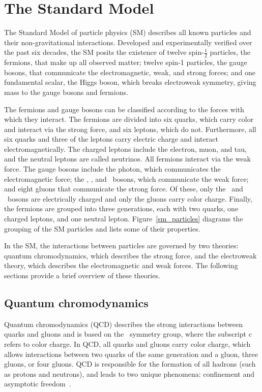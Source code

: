 \section{The Standard Model}
The Standard Model of particle physics (SM) describes all known particles and their non-gravitational interactions. Developed and experimentally verified over the past six decades, the SM posits the existence of twelve spin-$\frac{1}{2}$ particles, the fermions, that make up all observed matter; twelve spin-1 particles, the gauge bosons, that communicate the electromagnetic, weak, and strong forces; and one fundamental scalar, the Higgs boson, which breaks electroweak symmetry, giving mass to the gauge bosons and fermions.

The fermions and gauge bosons can be classified according to the forces with which they interact. The fermions are divided into six quarks, which carry color and interact via the strong force, and six leptons, which do not. Furthermore, all six quarks and three of the leptons carry electric charge and interact electromagnetically. The charged leptons include the electron, muon, and tau, and the neutral leptons are called neutrinos. All fermions interact via the weak force. The gauge bosons include the photon, which communicates the electromagnetic force; the \PWp, \PWm, and \cPZ\ bosons, which communicate the weak force; and eight gluons that communicate the strong force. Of these, only the \PWp\ and \PWm\ bosons are electrically charged and only the gluons carry color charge. Finally, the fermions are grouped into three generations, each with two quarks, one charged leptons, and one neutral lepton. Figure~\ref{sm_particles} diagrams the grouping of the SM particles and lists some of their properties.



In the SM, the interactions between particles are governed by two theories: quantum chromodynamics, which describes the strong force, and the electroweak theory, which describes the electromagnetic and weak forces. The following sections provide a brief overview of these theories.

\subsection{Quantum chromodynamics}
Quantum chromodynamics (QCD) describes the strong interactions between \linebreak[4]quarks and gluons and is based on the \suthreec\ symmetry group, where the subscript $\mathrm{c}$ refers to color charge. In QCD, all quarks and gluons carry color charge, which allows interactions between two quarks of the same generation and a gluon, three gluons, or four gluons. QCD is responsible for the formation of all hadrons (such as protons and neutrons), and leads to two unique phenomena: confinement and asymptotic freedom~\cite{gross_wilczek_73, qcd_73}. 

